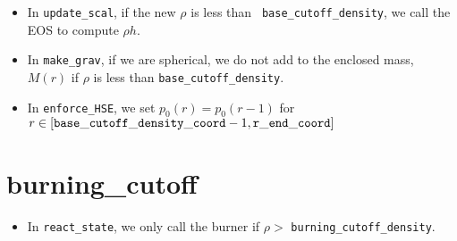 \begin{itemize}
\item In {\tt update\_scal}, if the new $\rho$ is less than {\tt
  base\_cutoff\_density}, we call the EOS to compute $\rho h$.

\item In {\tt make\_grav}, if we are spherical, we do not add to the
  enclosed mass, $M(r)$ if $\rho$ is less than {\tt base\_cutoff\_density}.

\item In {\tt enforce\_HSE}, we set $p_0(r) = p_0(r-1)$ for 
  $r\in[{\tt base\_cutoff\_density\_coord}-1,{\tt r\_end\_coord}]$

\end{itemize}

\section{burning\_cutoff}

\begin{itemize}

\item In {\tt react\_state}, we only call the burner if 
  $\rho >$ {\tt burning\_cutoff\_density}.

\end{itemize}

